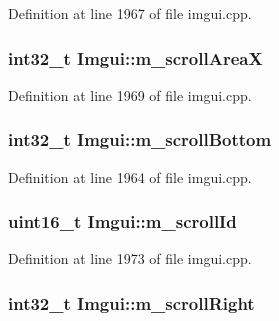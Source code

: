 Definition at line 1967 of file imgui.\+cpp.

\hypertarget{struct_imgui_a556405944c01311715fc025bf22e69c8}{
\subsubsection[{m\+\_\+scroll\+Area\+X}]{\setlength{\rightskip}{0pt plus 5cm}int32\+\_\+t Imgui\+::m\+\_\+scroll\+Area\+X}}\label{struct_imgui_a556405944c01311715fc025bf22e69c8}


Definition at line 1969 of file imgui.\+cpp.

\hypertarget{struct_imgui_a5f91076681b523cf51371482b60c89cb}{
\subsubsection[{m\+\_\+scroll\+Bottom}]{\setlength{\rightskip}{0pt plus 5cm}int32\+\_\+t Imgui\+::m\+\_\+scroll\+Bottom}}\label{struct_imgui_a5f91076681b523cf51371482b60c89cb}


Definition at line 1964 of file imgui.\+cpp.

\hypertarget{struct_imgui_a30e8e81ea0ea2ceaaa9b495d7a93626a}{
\subsubsection[{m\+\_\+scroll\+Id}]{\setlength{\rightskip}{0pt plus 5cm}uint16\+\_\+t Imgui\+::m\+\_\+scroll\+Id}}\label{struct_imgui_a30e8e81ea0ea2ceaaa9b495d7a93626a}


Definition at line 1973 of file imgui.\+cpp.

\hypertarget{struct_imgui_a05c7c15bafb234b3aa31dc8ef87cca90}{
\subsubsection[{m\+\_\+scroll\+Right}]{\setlength{\rightskip}{0pt plus 5cm}int32\+\_\+t Imgui\+::m\+\_\+scroll\+Right}}\label{struct_imgui_a05c7c15bafb234b3aa31dc8ef87cca90}


